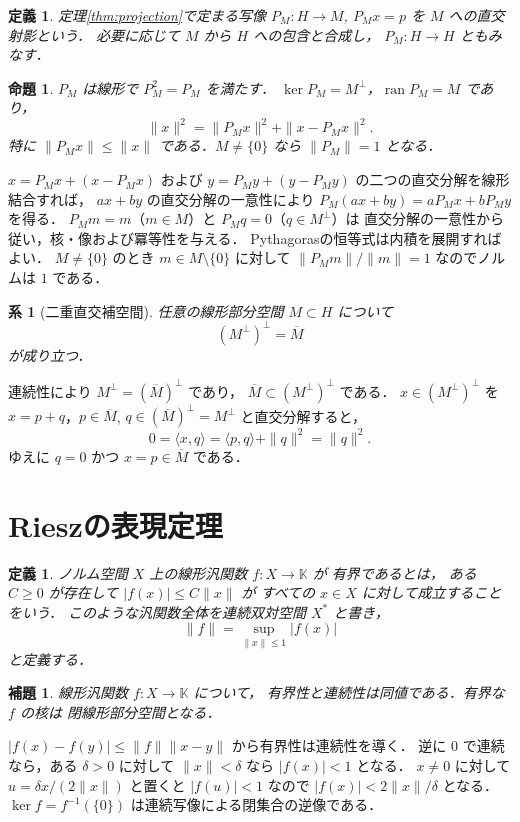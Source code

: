 \documentclass[a5paper,10pt,onecolumn]{jsarticle}
\makeatletter
\theoremstyle{mathnotetheorem}
\newtheorem{definition}[theorem]{定義}
\newtheorem{lemma}[theorem]{補題}
\newtheorem{proposition}[theorem]{命題}
\newtheorem{corollary}[theorem]{系}
\renewcommand{\proofname}{証明}
\renewenvironment{proof}[1][\proofname]{%
  \par\pushQED{\qed}\normalfont\topsep4\p@\@plus2\p@\relax
  \trivlist\item[\hskip\labelsep\bfseries #1]\ignorespaces
}{\popQED\endtrivlist\@endpefalse}
\makeatother
\begin{document}
\begin{definition}
定理\ref{thm:projection}で定まる写像
$P_M:H\to M$, $P_Mx=p$ を $M$ への\emph{直交射影}という．
必要に応じて $M$ から $H$ への包含と合成し，
$P_M:H\to H$ ともみなす．
\end{definition}

\begin{proposition}\label{prop:projection}
$P_M$ は線形で $P_M^2=P_M$ を満たす．
$\ker P_M=M^\perp$，$\operatorname{ran}P_M=M$ であり，
\[
 \|x\|^2=\|P_Mx\|^2+\|x-P_Mx\|^2.
\]
特に $\|P_Mx\|\le\|x\|$ である．$M\ne\{0\}$ なら
$\|P_M\|=1$ となる．
\end{proposition}
\begin{proof}
$x=P_Mx+(x-P_Mx)$ および
$y=P_My+(y-P_My)$ の二つの直交分解を線形結合すれば，
$ax+by$ の直交分解の一意性により
$P_M(ax+by)=aP_Mx+bP_My$ を得る．
$P_Mm=m$（$m\in M$）と $P_Mq=0$（$q\in M^\perp$）は
直交分解の一意性から従い，核・像および冪等性を与える．
Pythagorasの恒等式は内積を展開すればよい．
$M\ne\{0\}$ のとき $m\in M\setminus\{0\}$ に対して
$\|P_Mm\|/\|m\|=1$ なのでノルムは $1$ である．
\end{proof}

\begin{corollary}[二重直交補空間]
任意の線形部分空間 $M\subset H$ について
\[
 (M^\perp)^\perp=\overline M
\]
が成り立つ．
\end{corollary}
\begin{proof}
連続性により $M^\perp=(\overline M)^\perp$ であり，
$\overline M\subset(M^\perp)^\perp$ である．
$x\in(M^\perp)^\perp$ を
$x=p+q$，$p\in\overline M$, $q\in(\overline M)^\perp=M^\perp$
と直交分解すると，
\[
 0=\langle x,q\rangle=\langle p,q\rangle+\|q\|^2=\|q\|^2.
\]
ゆえに $q=0$ かつ $x=p\in\overline M$ である．
\end{proof}

\section{Rieszの表現定理}

\begin{definition}
ノルム空間 $X$ 上の線形汎関数 $f:X\to\mathbb K$ が
\emph{有界}であるとは，
ある $C\ge0$ が存在して $|f(x)|\le C\|x\|$ が
すべての $x\in X$ に対して成立することをいう．
このような汎関数全体を連続双対空間 $X^*$ と書き，
\[
 \|f\|=\sup_{\|x\|\le1}|f(x)|
\]
と定義する．
\end{definition}

\begin{lemma}
線形汎関数 $f:X\to\mathbb K$ について，
有界性と連続性は同値である．有界な $f$ の核は
閉線形部分空間となる．
\end{lemma}
\begin{proof}
$|f(x)-f(y)|\le\|f\|\|x-y\|$ から有界性は連続性を導く．
逆に $0$ で連続なら，ある $\delta>0$ に対して
$\|x\|<\delta$ なら $|f(x)|<1$ となる．
$x\ne0$ に対して $u=\delta x/(2\|x\|)$ と置くと
$|f(u)|<1$ なので $|f(x)|<2\|x\|/\delta$ となる．
$\ker f=f^{-1}(\{0\})$ は連続写像による閉集合の逆像である．
\end{proof}
\end{document}
